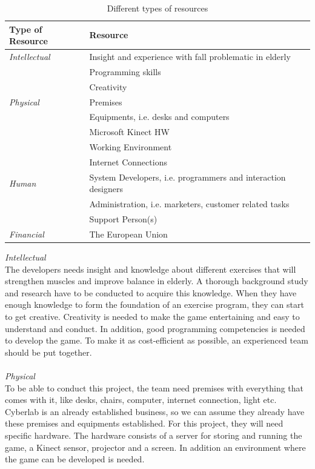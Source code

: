 \begin{table}
\centering
    \begin{tabular}{|l|l|}
        \hline
       \textbf{Type of Resource} & \textbf{Resource}  \\ \hline
       \emph{Intellectual} & Insight and experience with fall problematic in elderly \\ \cline{2-2}
        & Programming skills \\ \cline{2-2}
	 	& Creativity \\ \hline
	   \emph{Physical} & Premises \\ \cline{2-2}
	   	& Equipments, i.e. desks and computers \\ \cline{2-2}
	   	& Microsoft Kinect HW \\ \cline{2-2}
	   	& Working Environment \\ \cline{2-2}
	   	& Internet Connections \\ \hline
	   \emph{Human} & System Developers, i.e. programmers and interaction designers \\ \cline{2-2}
	   	& Administration, i.e. marketers, customer related tasks \\ \cline{2-2}
	   	& Support Person(s) \\ \hline
	   \emph{Financial} & The European Union \\
        \hline
    \end{tabular}
    \caption[Resources]{Different types of resources}
    \label{tab:Resources}
\end{table} 
\emph{Intellectual} \\ The developers needs insight and knowledge about different exercises that will strengthen muscles and improve balance in elderly. A thorough background study and research have to be conducted to acquire this knowledge. When they have enough knowledge to form the foundation of an exercise program, they can start to get creative. Creativity is needed to make the game entertaining and easy to understand and conduct. In addition, good programming competencies is needed to develop the game. To make it as cost-efficient as possible, an experienced team should be put together. \\ \\
\emph{Physical} \\ To be able to conduct this project, the team need premises with everything that comes with it, like desks, chairs, computer, internet connection, light etc. Cyberlab is an already established business, so we can assume they already have these premises and equipments established. For this project, they will need specific hardware. The hardware consists of a server for storing and running the game, a Kinect sensor, projector and a screen. In addition an environment where the game can be developed is needed. \\ \\
